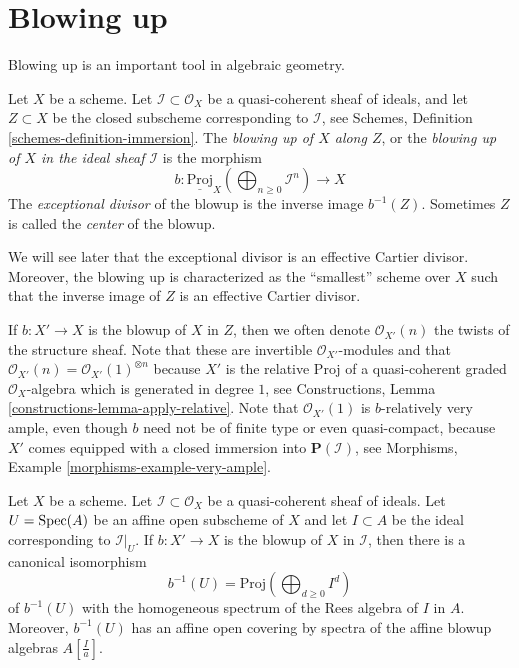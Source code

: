 \section{Blowing up}
\label{section-blowing-up}

\noindent
Blowing up is an important tool in algebraic geometry.

\begin{definition}
\label{definition-blow-up}
Let $X$ be a scheme. Let $\mathcal{I} \subset \mathcal{O}_X$ be a
quasi-coherent sheaf of ideals, and let $Z \subset X$ be the closed subscheme
corresponding to $\mathcal{I}$, see
Schemes, Definition \ref{schemes-definition-immersion}.
The {\it blowing up of $X$ along $Z$}, or the
{\it blowing up of $X$ in the ideal sheaf $\mathcal{I}$} is
the morphism
$$
b :
\underline{\text{Proj}}_X
\left(\bigoplus\nolimits_{n \geq 0} \mathcal{I}^n\right)
\longrightarrow
X
$$
The {\it exceptional divisor} of the blowup is the inverse image
$b^{-1}(Z)$. Sometimes $Z$ is called the {\it center} of the blowup.
\end{definition}

\noindent
We will see later that the exceptional divisor is an effective Cartier
divisor. Moreover, the blowing up is characterized as the ``smallest'' scheme
over $X$ such that the inverse image of $Z$ is an effective Cartier divisor.

\medskip\noindent
If $b : X' \to X$ is the blowup of $X$ in $Z$, then we often denote
$\mathcal{O}_{X'}(n)$ the twists of the structure sheaf. Note that these
are invertible $\mathcal{O}_{X'}$-modules and that
$\mathcal{O}_{X'}(n) = \mathcal{O}_{X'}(1)^{\otimes n}$
because $X'$ is the relative Proj of a quasi-coherent graded
$\mathcal{O}_X$-algebra which is generated in degree $1$, see
Constructions, Lemma \ref{constructions-lemma-apply-relative}.
Note that $\mathcal{O}_{X'}(1)$ is $b$-relatively very ample, even though
$b$ need not be of finite type or even quasi-compact, because
$X'$ comes equipped with a closed immersion into $\mathbf{P}(\mathcal{I})$,
see Morphisms, Example \ref{morphisms-example-very-ample}.

\begin{lemma}
\label{lemma-blowing-up-affine}
Let $X$ be a scheme. Let $\mathcal{I} \subset \mathcal{O}_X$ be a
quasi-coherent sheaf of ideals. Let $U = \mathop{\mathrm{Spec}}(A)$ be an affine open
subscheme of $X$ and let $I \subset A$ be the ideal corresponding to
$\mathcal{I}|_U$. If $b : X' \to X$ is the blowup of $X$ in $\mathcal{I}$,
then there is a canonical isomorphism
$$
b^{-1}(U) = \text{Proj}(\bigoplus\nolimits_{d \geq 0} I^d)
$$
of $b^{-1}(U)$ with the homogeneous spectrum of the Rees algebra
of $I$ in $A$. Moreover, $b^{-1}(U)$ has an affine open covering by
spectra of the affine blowup algebras $A[\frac{I}{a}]$.
\end{lemma}


